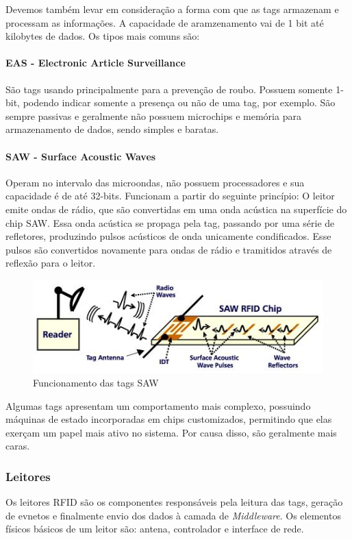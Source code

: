 	Devemos também levar em consideração a forma com que as tags armazenam e processam as informações. A capacidade de aramzenamento vai de 1 bit até kilobytes de dados. Os tipos mais comuns são:
	
	\paragraph{EAS - Electronic Article Surveillance} São tags usando principalmente para a prevenção de roubo. Possuem somente 1-bit, podendo indicar somente a presença ou não de uma tag, por exemplo. São sempre passivas e geralmente não possuem microchips e memória para armazenamento de dados, sendo simples e baratas. 
	
	\paragraph{SAW - Surface Acoustic Waves} Operam no intervalo das microondas, não possuem processadores e sua capacidade é de até 32-bits. Funcionam a partir do seguinte princípio: O leitor emite ondas de rádio, que são convertidas em uma onda acústica na superfície do chip SAW. Essa onda acústica se propaga pela tag, passando por uma série de refletores, produzindo pulsos acústicos de onda unicamente condificados. Esse pulsos são convertidos novamente  para ondas de rádio e tramitidos através de reflexão para o leitor.
	
		\begin{figure}[h!]
			\centering
			\includegraphics[width=0.5\linewidth]{sawrfid_chip}
			\caption{Funcionamento das tags SAW}
			\label{fig:sawtag}
		\end{figure}
		
	Algumas tags apresentam um comportamento mais complexo, possuindo máquinas de estado incorporadas em chips customizados, permitindo que elas exerçam um papel mais ativo no sistema. Por causa disso, são geralmente mais caras. 
	
	\subsubsection{Leitores}
	Os leitores RFID são os componentes responsáveis pela leitura das tags, geração de evnetos e finalmente envio dos dados à camada de \textit{Middleware}. Os elementos físicos básicos de um leitor são: antena, controlador e interface de rede.
	
